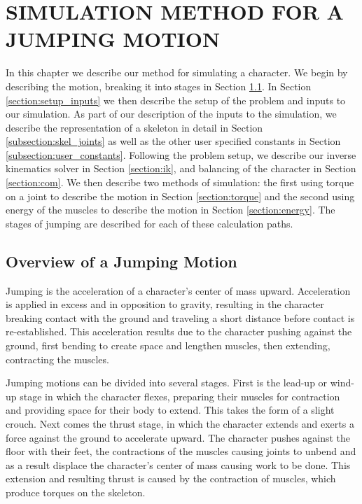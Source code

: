  
\chapter{SIMULATION METHOD FOR A JUMPING MOTION}
\label{chapter:animation}
In this chapter we describe our method for simulating a character.  We begin by describing the motion, breaking it into stages in Section \ref{section:motion_desc}.  In Section \ref{section:setup_inputs} we then describe the setup of the problem and inputs to our simulation.  As part of our description of the inputs to the simulation, we describe the representation of a skeleton in detail in Section \ref{subsection:skel_joints} as well as the other user specified constants in Section \ref{subsection:user_constants}.  Following the problem setup, we describe our inverse kinematics solver in Section \ref{section:ik}, and balancing of the character in Section \ref{section:com}.  We then describe two methods of simulation: the first using torque on a joint to describe the motion in Section \ref{section:torque} and the second using energy of the muscles to describe the motion in Section \ref{section:energy}.  The stages of jumping are described for each of these calculation paths.

\section{Overview of a Jumping Motion}
\label{section:motion_desc}
Jumping is the acceleration of a character's center of mass upward.  Acceleration is applied in excess and in opposition to gravity, resulting in the character breaking contact with the ground and traveling a short distance before contact is re-established.  This acceleration results due to the character pushing against the ground, first bending to create space and lengthen muscles, then extending, contracting the muscles.

Jumping motions can be divided into several stages.  First is the lead-up or wind-up stage in which the character flexes, preparing their muscles for contraction and providing space for their body to extend.  This takes the form of a slight crouch.  Next comes the thrust stage, in which the character extends and exerts a force against the ground to accelerate upward.  The character pushes against the floor with their feet, the contractions of the muscles causing joints to unbend and as a result displace the character's center of mass causing work to be done.  This extension and resulting thrust is caused by the contraction of muscles, which produce torques on the skeleton.


